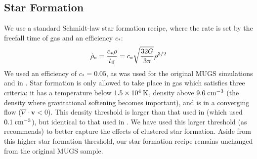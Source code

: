 \subsection{Star Formation}
We use a standard Schmidt-law star formation recipe, where the rate is set by
the freefall time of gas and an efficiency $c_*$: \begin{equation} \dot \rho_* =
\frac{c_*\rho}{t_{\rm ff}} = c_*\sqrt{\frac{32G}{\rm 3\pi}}\rho^{3/2} \end{equation} We
used an efficiency of $c_*=0.05$, as was used for the original MUGS simulations
\citep{Stinson2010} and in \citet{Keller2015}.  Star formation is only allowed
to take place in gas which satisfies three criteria: it has a temperature below
$1.5\times10^4\>{\rm K}$, density above $9.6\;\rm{cm^{-3}}$ (the density where
gravitational softening becomes important), and is in a converging flow
($\nabla\cdot \boldsymbol{v} < 0$).  This density threshold is larger than that used
in \citet{Stinson2010} (which used $0.1\;\rm{cm^{-3}}$), but identical to that
used in \citet{Stinson2013}.  We have used this larger threshold (as
\citealt{Governato2010} recommends) to better capture the effects of clustered
star formation.  Aside from this higher star formation threshold, our star
formation recipe remains unchanged from the original MUGS sample.

